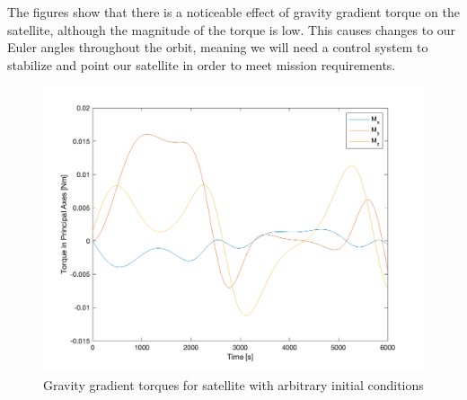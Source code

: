 The figures show that there is a noticeable effect of gravity gradient torque on the satellite, although the magnitude of the torque is low. This causes changes to our Euler angles throughout the orbit, meaning we will need a control system to stabilize and point our satellite in order to meet mission requirements.

\begin{figure}[H]
\centering
\includegraphics[scale=0.6]{Images/ps4_problem4e_torque.png}
\caption{Gravity gradient torques for satellite with arbitrary initial conditions}
\label{fig:ps4_problem4e_torque.png}
\end{figure}